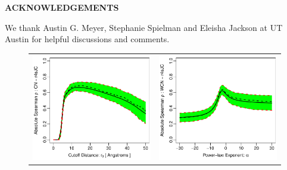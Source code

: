 \documentclass[11pt]{article}
\def\Acknowledgements{\bigskip  \bigskip \begin{center} \begin{large}
             \bf ACKNOWLEDGEMENTS \end{large}\end{center}}
\begin{document}
\Acknowledgements

We thank Austin G. Meyer, Stephanie Spielman and Eleisha Jackson at UT Austin for helpful discussions and comments.




\newpage

    \begin{figure}
        \begin{center}
        \begin{tabular}{cc}
            \includegraphics[width=3.3in]{../../wcn_best_definition/analysis/figures/get_quantiles/screen_plots/spcor_cnSC_r4sJC.pdf} & \includegraphics[width=3.3in]{../../wcn_best_definition/analysis/figures/get_quantiles/screen_plots/spcor_wcnpSC_r4sJC.pdf}
        \end{tabular}
        \end{center}

\end{figure}
\end{document}
